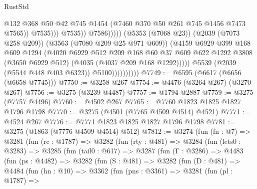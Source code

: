 \begin{lexlean}{RustStd}
\begin{coremodule}
                                                @132
                                                @368
                                                @50
                                                @42
                                                @745
                                                @1454
                                                (@7460 @370 @50 @261 @745 @1456 @7473 @7565))
                                              @7535)))
                                        @7535))
                                    @7586)))))
                          (@5353 (@7068 @23))
                          (@2039 (@7073 @258 @209))
                          (@3563 (@7080 @209 @25 @971 @609))
                          (@4159
                            @6929
                            @399
                            @168
                            @609
                            @1294
                            (@4020
                              @6929
                              @512
                              @209
                              @168
                              @60
                              @37
                              @609
                              @622
                              @1292
                              @3808
                              (@3650 @6929 @512)
                              (@4035 (@4037 @209 @168 @1292)))))
                        @5539
                        (@2039 (@5544 @448 @403 @6323))
                        @5100))))))))))
@7749 := @6595 (@6617 (@6656 (@6658 @7745)))
@7750 := @3258 @267
@7754 := @4476 (@3264 @267) (@3270 @267)
@7756 := @3275 (@3239 @4487)
@7757 := @1794 @2887
@7759 := @3275 (@7757 @4496)
@7760 := @4502 @267
@7765 := @7760 @1823 @1825 @1827 @1796 @1798
@7770 := @3275 (@4501 (@7765 @4509 @4514) @4521)
@7771 := @4524 @267
@7776 := @7771 @1823 @1825 @1827 @1796 @1798
@7781 := @3275 (@1863 (@7776 @4509 @4514) @512)
@7812 := @3274
    (fun (fn : @7) =>
    @3281
      (fun (rc : @1787) =>
      @3282
        (fun (rty : @481) =>
        @3284
          (fun (lets0 : @3283) =>
          @3285
            (fun (tail0 : @617) =>
            @3287
              (fun (Γ : @3286) =>
              @4483
                (fun (ps : @4482) =>
                @3282
                  (fun (S : @481) =>
                  @3282
                    (fun (D : @481) =>
                    @4484
                      (fun (hn : @10) =>
                      @3362
                        (fun (pns : @3361) =>
                        @3281
                          (fun (pl : @1787) =>

\end{coremodule}
\end{lexlean}

